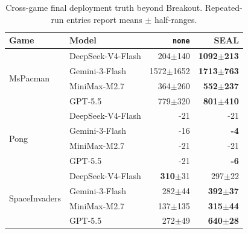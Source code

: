 \documentclass[letterpaper]{article} \usepackage{aaai2027}  \usepackage[hyphens]{url}  \usepackage{graphicx} \urlstyle{rm} \def\UrlFont{\rm}  \usepackage{natbib}  \usepackage{caption} \usepackage{amsfonts} \usepackage{multirow} \frenchspacing  \usepackage{algorithm}
\newcommand{\method}{SEAL}
\begin{document}
\begin{table}[t]
\centering
\small
\setlength{\tabcolsep}{2pt}
\renewcommand{\arraystretch}{1.02}
\begin{tabular}{llrr}
\toprule
\textbf{Game} & \textbf{Model} & \texttt{none} & \textbf{\method{}} \\
\midrule
\multirow{4}{*}{MsPacman}
 & DeepSeek-V4-Flash & 204$\pm$140 & \textbf{1092$\pm$213} \\
 & Gemini-3-Flash & 1572$\pm$1652 & \textbf{1713$\pm$763} \\
 & MiniMax-M2.7 & 364$\pm$260 & \textbf{552$\pm$237} \\
& GPT-5.5 & 779$\pm$320 & \textbf{801$\pm$410} \\
\midrule
\multirow{4}{*}{Pong}
 & DeepSeek-V4-Flash & -21 & -21 \\
 & Gemini-3-Flash & -16 & \textbf{-4} \\
 & MiniMax-M2.7 & -21 & -21 \\
& GPT-5.5 & -21 & \textbf{-6} \\
\midrule
\multirow{4}{*}{SpaceInvaders}
 & DeepSeek-V4-Flash & \textbf{310}$\pm$31 & 297$\pm$22 \\
 & Gemini-3-Flash & 282$\pm$44 & \textbf{392$\pm$37} \\
 & MiniMax-M2.7 & 137$\pm$135 & \textbf{315$\pm$44} \\
& GPT-5.5 & 272$\pm$49 & \textbf{640$\pm$28} \\
\bottomrule
\end{tabular}
\caption{Cross-game final deployment truth beyond Breakout. Repeated-run entries report means $\pm$ half-ranges.}
\label{tab:pilot-crossgame}
\end{table}
\end{document}
